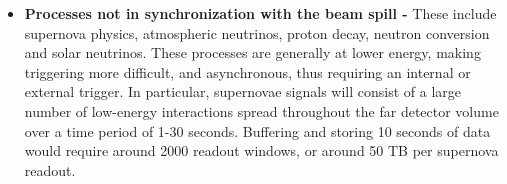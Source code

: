 \begin{itemize}
%






\item {\bf Processes not in synchronization with the beam spill -} These include supernova physics, atmospheric neutrinos, proton decay, neutron conversion and solar neutrinos.  These processes are generally at lower energy, making triggering more difficult, and asynchronous, thus requiring an internal or external trigger.  In particular, supernovae signals will consist of a large number of low-energy interactions spread throughout the far detector volume over a time period of 1-30 seconds. Buffering and storing 10 seconds of data would require around 2000 readout windows, or around 50 TB per supernova readout.  


\end{itemize}
